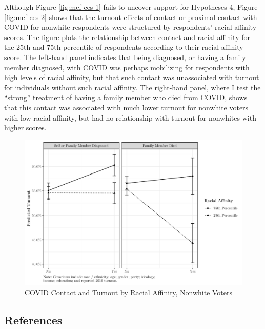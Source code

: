\documentclass[
  12pt,
]{article}
\begin{document}
Although Figure \ref{fig:mef-ces-1} fails to uncover support for Hypotheses 4, Figure \ref{fig:mef-ces-2} shows that the turnout effects of contact or proximal contact with COVID for nonwhite respondents were structured by respondents' racial affinity scores. The figure plots the relationship between contact and racial affinity for the 25th and 75th percentile of respondents according to their racial affinity score. The left-hand panel indicates that being diagnosed, or having a family member diagnosed, with COVID was perhaps mobilizing for respondents with high levels of racial affinity, but that such contact was unassociated with turnout for individuals without such racial affinity. The right-hand panel, where I test the ``strong'' treatment of having a family member who died from COVID, shows that this contact was associated with much lower turnout for nonwhite voters with low racial affinity, but had no relationship with turnout for nonwhites with higher scores.

\begin{figure}[H]

{\centering \includegraphics{wa_covid_files/figure-latex/mef2-1} 

}

\caption{\label{fig:mef-ces-2}COVID Contact and Turnout by Racial Affinity, Nonwhite Voters}\label{fig:mef2}
\end{figure}

\newpage

\hypertarget{references}{%
\subsection*{References}\label{references}}
\end{document}
